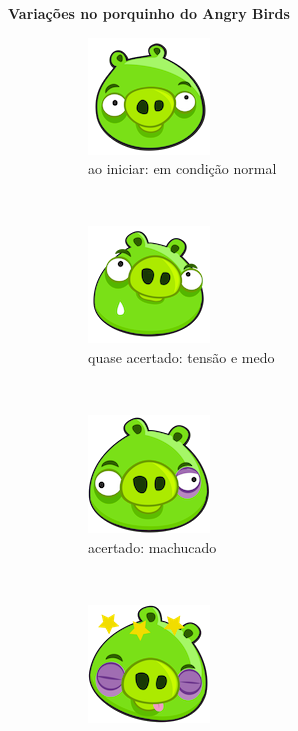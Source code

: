 \expandafter\documentclass\expandafter[table, usenames, svgnames, dvipsnames, \classopts]{beamer}
\begin{document}
\begin{frame}{\textbf{Variações no porquinho do Angry Birds}}

	\begin{figure}
	    \centering

	    \begin{subfigure}[!h]{0.2\paperwidth}
	    	\centering
	    	\includegraphics[draft,height=0.2\paperheight]{angry-birds-pig1}
	        \caption{\scriptsize ao iniciar: em condição normal}
	    \end{subfigure}
	    ~
		\begin{subfigure}[!h]{0.2\paperwidth}
			\centering
	        \includegraphics[draft,height=0.2\paperheight]{angry-birds-pig2}
	        \caption{\scriptsize quase acertado: tensão e medo}
	    \end{subfigure}
	    ~
		\begin{subfigure}[!h]{0.2\paperwidth}
			\centering
	        \includegraphics[draft,height=0.2\paperheight]{angry-birds-pig3}
	        \caption{\scriptsize acertado: machucado}
	    \end{subfigure}
	    \\
		\begin{subfigure}[!h]{0.2\paperwidth}
			\centering
	        \includegraphics[draft,height=0.2\paperheight]{angry-birds-pig4}

\end{subfigure}
\end{figure}
\end{frame}
\end{document}
